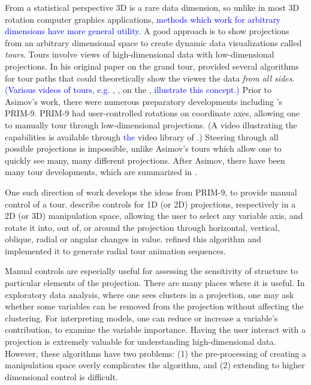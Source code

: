 \documentclass[]{interact}
\theoremstyle{plain}%
\theoremstyle{definition}
\theoremstyle{remark}
\begin{document}
From a statistical perspective 3D is a rare data dimension, so unlike in
most 3D rotation computer graphics applications,
\textcolor{blue}{methods which work for arbitrary dimensions have more general utility}.
A good approach is to show projections from an arbitrary dimensional
space to create dynamic data visualizations called \emph{tours}. Tours
involve views of high-dimensional data with low-dimensional projections.
In his original paper on the grand tour, \citet{As85} provided several
algorithms for tour paths that could theoretically show the viewer the
data \emph{from all sides}.
\textcolor{blue}{(Various videos of tours, e.g.} \citet{dataviewer},
\citet{gt-pp-video}, on the \citet{ASA22},
\textcolor{blue}{illustrate this concept.)} Prior to Asimov's work,
there were numerous preparatory developments including \citet{tukey}'s
PRIM-9. PRIM-9 had user-controlled rotations on coordinate axes,
allowing one to manually tour through low-dimensional projections. (A
video \citep{PRIM9-video} illustrating the capabilities is available
through \textcolor{blue}{the} video library of \citet{ASA22}.) Steering
through all possible projections is impossible, unlike Asimov's tours
which allow one to quickly see many, many different projections. After
Asimov, there have been many tour developments, which are summarized in
\citet{lee2021}.

One such direction of work develops the ideas from PRIM-9, to provide
manual control of a tour. \citet{cook_manual_1997} describe controls for
1D (or 2D) projections, respectively in a 2D (or 3D) manipulation space,
allowing the user to select any variable axis, and rotate it into, out
of, or around the projection through horizontal, vertical, oblique,
radial or angular changes in value. \citet{spyrison_spinifex_2020}
refined this algorithm and implemented it to generate radial tour
animation sequences.

Manual controls are especially useful for assessing the sensitivity of
structure to particular elements of the projection. There are many
places where it is useful. In exploratory data analysis, where one sees
clusters in a projection, one may ask whether some variables can be
removed from the projection without affecting the clustering. For
interpreting models, one can reduce or increase a variable's
contribution, to examine the variable importance. Having the user
interact with a projection is extremely valuable for understanding
high-dimensional data. However, these algorithms have two problems: (1)
the pre-processing of creating a manipulation space overly complicates
the algorithm, and (2) extending to higher dimensional control is
difficult.
\end{document}
